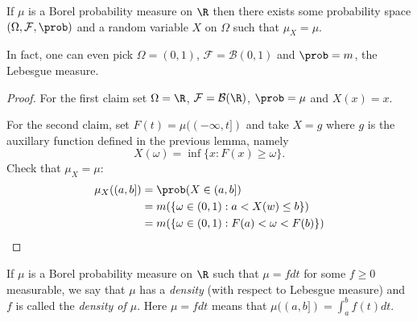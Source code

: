 \documentclass[a4paper]{article}
\renewcommand{\P}{\prob} %
\begin{document}
\begin{proposition}
  If \(\mu\) is a Borel probability measure on \(\R\) then there exists some probability space \((\Omega, \mathcal F, \P)\) and a random variable \(X\) on \(\Omega\) such that \(\mu_X = \mu\).

  In fact, one can even pick \(\Omega = (0, 1)\), \(\mathcal F = \mathcal B(0, 1)\) and \(\P = m\), the Lebesgue measure.
\end{proposition}

\begin{proof}
  For the first claim set \(\Omega = \R\), \(\mathcal F = \mathcal B(\R)\), \(\P = \mu\) and \(X(x) = x\).

  For the second claim, set \(F(t) = \mu((-\infty, t])\) and take \(X = g\) where \(g\) is the auxillary function defined in the previous lemma, namely
  \[
    X(\omega) = \inf\{x: F(x) \geq \omega\}.
  \]
  Check that \(\mu_X = \mu\):
  \begin{align*}
    \mu_X((a, b])
    &= \P(X \in (a, b]) \\
    &= m(\{\omega \in (0, 1): a < X(w) \leq b\}) \\
    &= m(\{\omega \in (0, 1): F(a) < \omega < F(b)\})
  \end{align*}
\end{proof}

\begin{remark}
  If \(\mu\) is a Borel probability measure on \(\R\) such that \(\mu = f dt\) for some \(f \geq 0\) measurable, we say that \(\mu\) has a \emph{density} (with respect to Lebesgue measure) and \(f\) is called the \emph{density of \(\mu\)}. Here \(\mu = f dt\) means that \(\mu((a, b]) = \int_a^b f(t) dt\).
\end{remark}
\end{document}
